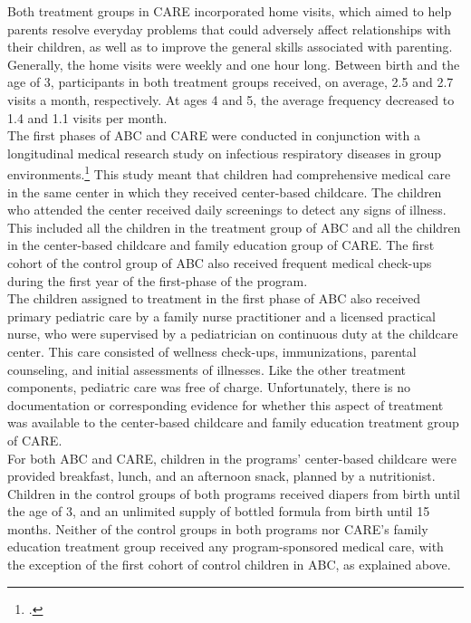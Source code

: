 \noindent Both treatment groups in CARE incorporated home visits, which aimed to help parents resolve everyday problems that could adversely affect relationships with their children, as well as to improve the general skills associated with parenting. Generally, the home visits were weekly and one hour long. Between birth and the age of 3, participants in both treatment groups received, on average, 2.5 and 2.7 visits a month, respectively. At ages 4 and 5, the average frequency decreased to 1.4 and 1.1 visits per month.\\ 

\noindent The first phases of ABC and CARE were conducted in conjunction with a longitudinal medical research study on infectious respiratory diseases in group environments.\footnote{\citet{Henderson-et-al_1982_NEJoM}.} This study meant that children had comprehensive medical care in the same center in which they received center-based childcare. The children who attended the center received daily screenings to detect any signs of illness. This included all the children in the treatment group of ABC and all the children in the center-based childcare and family education group of CARE. The first cohort of the control group of ABC also received frequent medical check-ups during the first year of the first-phase of the program.\\

\noindent The children assigned to treatment in the first phase of ABC also received primary pediatric care by a family nurse practitioner and a licensed practical nurse, who were supervised by a pediatrician on continuous duty at the childcare center. This care consisted of wellness check-ups, immunizations, parental counseling, and initial assessments of illnesses. Like the other treatment components, pediatric care was free of charge. Unfortunately, there is no documentation or corresponding evidence for whether this aspect of treatment was available to the center-based childcare and family education treatment group of CARE.\\

\noindent For both ABC and CARE, children in the programs' center-based childcare were provided breakfast, lunch, and an afternoon snack, planned by a nutritionist. Children in the control groups of both programs received diapers from birth until the age of 3, and an unlimited supply of bottled formula from birth until 15 months. Neither of the control groups in both programs nor CARE's family education treatment group received any program-sponsored medical care, with the exception of the first cohort of control children in ABC, as explained above.\\


